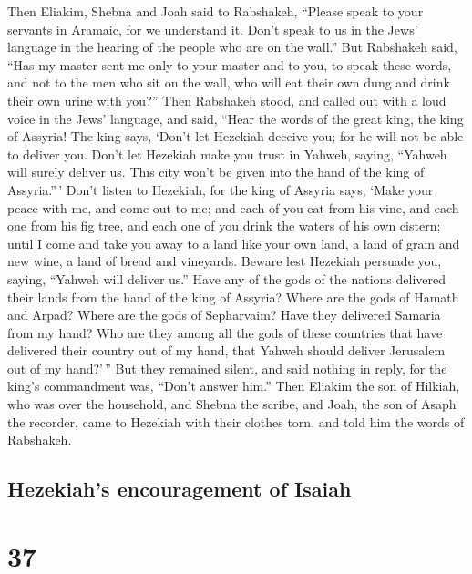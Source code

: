  Then Eliakim, Shebna and Joah said to Rabshakeh,
``Please speak to your servants in Aramaic, for we understand it. Don't
speak to us in the Jews' language in the hearing of the people who are
on the wall.''  But Rabshakeh said, ``Has my master sent
me only to your master and to you, to speak these words, and not to the
men who sit on the wall, who will eat their own dung and drink their own
urine with you?''  Then Rabshakeh stood, and called out
with a loud voice in the Jews' language, and said, ``Hear the words of
the great king, the king of Assyria!  The king says,
`Don't let Hezekiah deceive you; for he will not be able to deliver you.
 Don't let Hezekiah make you trust in Yahweh, saying,
``Yahweh will surely deliver us. This city won't be given into the hand
of the king of Assyria.''\,'  Don't listen to Hezekiah,
for the king of Assyria says, `Make your peace with me, and come out to
me; and each of you eat from his vine, and each one from his fig tree,
and each one of you drink the waters of his own cistern; 
until I come and take you away to a land like your own land, a land of
grain and new wine, a land of bread and vineyards. 
Beware lest Hezekiah persuade you, saying, ``Yahweh will deliver us.''
Have any of the gods of the nations delivered their lands from the hand
of the king of Assyria?  Where are the gods of Hamath and
Arpad? Where are the gods of Sepharvaim? Have they delivered Samaria
from my hand?  Who are they among all the gods of these
countries that have delivered their country out of my hand, that Yahweh
should deliver Jerusalem out of my hand?'\,''  But they
remained silent, and said nothing in reply, for the king's commandment
was, ``Don't answer him.''  Then Eliakim the son of
Hilkiah, who was over the household, and Shebna the scribe, and Joah,
the son of Asaph the recorder, came to Hezekiah with their clothes torn,
and told him the words of Rabshakeh.

\hypertarget{hezekiahs-encouragement-of-isaiah}{%
\subsection{Hezekiah's encouragement of
Isaiah}\label{hezekiahs-encouragement-of-isaiah}}

\hypertarget{section-36}{%
\section{37}\label{section-36}}

